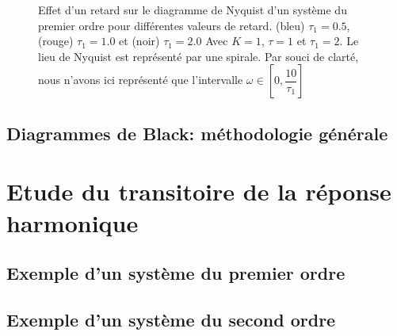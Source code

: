 \begin{figure}[!h]
\begin{center}
\end{center}
    \caption{Effet d'un retard sur le diagramme de Nyquist d'un système du premier ordre 
         pour différentes valeurs de retard. (bleu) $\tau_1=0.5$, (rouge) $\tau_1=1.0$ 
         et (noir) $\tau_1=2.0$
         Avec $K=1$, $\tau=1$ et $\tau_1=2$. Le lieu de Nyquist est représenté par 
         une spirale. Par souci de clarté, nous n'avons ici représenté que l'intervalle $\omega\in[0,\dfrac{10}{\tau_1}]$ 
         \label{fig-nyquist}}
\end{figure}

\subsection{Diagrammes de Black: méthodologie générale}

\section{Etude du transitoire de la réponse harmonique}
\acpl
\subsection{Exemple d'un système du premier ordre}
\acpl
\subsection{Exemple d'un système du second ordre}
\acpl


